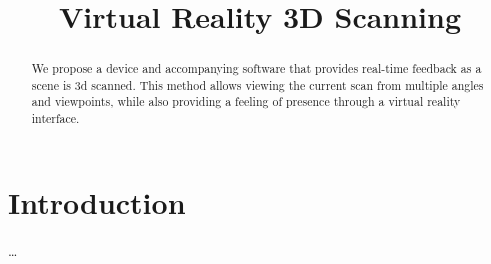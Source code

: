 \documentclass[pageno]{jpaper}
\begin{document}
\title{Virtual Reality 3D Scanning}

\date{}
\maketitle

\thispagestyle{empty}

\begin{abstract}
  We propose a device and accompanying software that provides real-time feedback
  as a scene is 3d scanned. This method allows viewing the current scan from
  multiple angles and viewpoints, while also providing a feeling of presence
  through a virtual reality interface.
\end{abstract}

\section{Introduction}

\ldots



\end{document}
